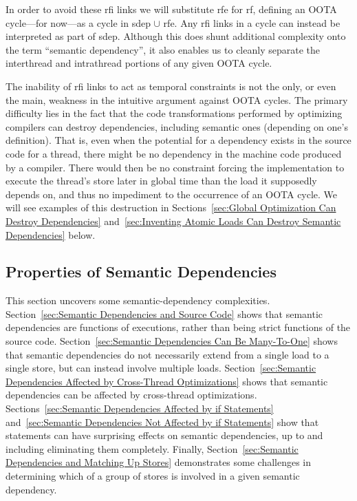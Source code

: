 \documentclass[10]{article}
\begin{document}
In order to avoid these rfi links we will substitute rfe
for rf, defining an OOTA cycle---for now---as a cycle in sdep $\cup$ rfe.
Any rfi links in a cycle can instead be interpreted as part of sdep.
Although this does shunt additional complexity onto the term
``semantic dependency'', it also enables us to cleanly separate
the interthread and intrathread portions of any given OOTA cycle.


The inability of rfi links to act as temporal constraints is not the
only, or even the main, weakness in the intuitive argument against
OOTA cycles.
The primary difficulty lies in the fact that the code transformations
performed by optimizing compilers can destroy dependencies, including
semantic ones (depending on one's definition).
That is, even when the potential for a dependency exists in the
source code for a thread, there might be no dependency in the machine
code produced by a compiler.
There would then be no constraint forcing the implementation to execute
the thread's store later in global time than the load it supposedly depends on,
and thus no impediment to the occurrence of an OOTA cycle.
We will see examples of this destruction in
Sections~\ref{sec:Global Optimization Can Destroy Dependencies}
and~\ref{sec:Inventing Atomic Loads Can Destroy Semantic Dependencies} below.

\subsection{Properties of Semantic Dependencies}
\label{sec:Properties of Semantic Dependencies}

This section uncovers some semantic-dependency complexities.
Section~\ref{sec:Semantic Dependencies and Source Code}
shows that semantic dependencies are functions of executions,
rather than being strict functions of the source code.
Section~\ref{sec:Semantic Dependencies Can Be Many-To-One}
shows that semantic dependencies do not necessarily extend
from a single load to a single store, but can instead involve
multiple loads.
Section~\ref{sec:Semantic Dependencies Affected by Cross-Thread Optimizations}
shows that semantic dependencies can be affected by cross-thread
optimizations.
Sections~\ref{sec:Semantic Dependencies Affected by if Statements}
and~\ref{sec:Semantic Dependencies Not Affected by if Statements}
show that  statements can have surprising effects on semantic
dependencies, up to and including eliminating them completely.
Finally,
Section~\ref{sec:Semantic Dependencies and Matching Up Stores}
demonstrates some challenges in determining which of a group of
stores is involved in a given semantic dependency.
\end{document}
